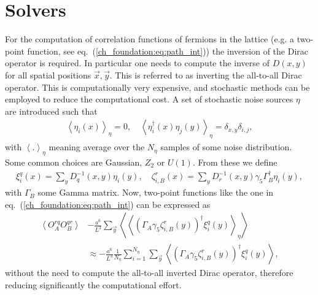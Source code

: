 
\chapter{Solvers}
\label{appex_solvers}

For the computation of correlation functions of fermions in the lattice (e.g. a two-point function, see eq.~(\ref{ch_foundation:eq:path_int})) the inversion of the Dirac operator is required. In particular one needs to compute the inverse of $D(x,y)$ for all spatial positions $\vec{x},\vec{y}$. This is referred to as inverting the all-to-all Dirac operator. This is computationally very expensive, and stochastic methods can be employed to reduce the computational cost. A set of stochastic noise sources $\eta$ are introduced such that
\begin{gather}
\left<\eta_i(x)\right>_{\eta}=0, \quad \left<\eta_i^{\dagger}(x)\eta_j(y)\right>_{\eta}=\delta_{x,y}\delta_{i,j},
\end{gather}
with $\left<.\right>_{\eta}$ meaning average over the $N_{\eta}$ samples of some noise distribution. Some common choices are Gaussian, $Z_2$ or $U(1)$. From these we define
\begin{gather}
\xi_i^q(x)=\sum_yD^{-1}_q(x,y)\eta_i(y), \quad \zeta_{i,B}^r(x)=\sum_yD^{-1}_r(x,y)\gamma_5\Gamma_B^{\dagger}\eta_i(y),
\end{gather}
with $\Gamma_B$ some Gamma matrix. Now, two-point functions like the one in eq.~(\ref{ch_foundation:eq:path_int}) can be expressed as
\begin{align}
\left<O^{rq}_AO^{qr}_B\right>&-\frac{a^6}{L^3}\sum_{\vec{y}}\left<\left<(\Gamma_A\gamma_5\zeta^r_{i,B}(y))^{\dagger}\xi^q_i(y)\right>_{\eta}\right> \\
&\approx -\frac{a^6}{L^3}\frac{1}{N_{\eta}}\sum_{i=1}^{N_{\eta}}\sum_{\vec{y}}\left<(\Gamma_A\gamma_5\zeta^r_{i,B}(y))^{\dagger}\xi^q_i(y)\right>,
\end{align}
without the need to compute the all-to-all inverted Dirac operator, therefore reducing significantly the computational effort.

